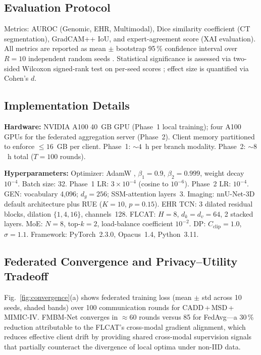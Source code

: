 \documentclass[a4paper,fleqn]{cas-dc}
\begin{document}
\subsection{Evaluation Protocol}

Metrics: AUROC (Genomic, EHR, Multimodal), Dice similarity coefficient
(CT segmentation), GradCAM++ IoU, and expert-agreement score (XAI evaluation).
All metrics are reported as mean $\pm$ bootstrap 95\,\% confidence interval
over $R\!=\!10$ independent random seeds \citep{efron1993bootstrap}.
Statistical significance is assessed via two-sided Wilcoxon signed-rank test
on per-seed scores \citep{wilcoxon1945}; effect size is quantified via Cohen's
$d$.

\subsection{Implementation Details}

\textbf{Hardware:} NVIDIA A100 40~GB GPU (Phase~1 local training); four
A100 GPUs for the federated aggregation server (Phase~2). Client memory
partitioned to enforce $\leq\!16$~GB per client. Phase~1: $\sim\!4$~h per
branch modality. Phase~2: $\sim\!8$~h total ($T\!=\!100$ rounds).

\textbf{Hyperparameters:} Optimizer: AdamW \citep{loshchilov2019adamw},
$\beta_1\!=\!0.9$, $\beta_2\!=\!0.999$, weight decay $10^{-4}$. Batch size: 32.
Phase~1 LR: $3\!\times\!10^{-4}$ (cosine to $10^{-6}$). Phase~2 LR: $10^{-4}$.
GEN: vocabulary 4,096; $d_g\!=\!256$; SSM-attention layers~3. Imaging: nnU-Net-3D
default architecture plus RUE ($K\!=\!10$, $p\!=\!0.15$). EHR TCN: 3 dilated
residual blocks, dilation $\{1,4,16\}$, channels~128. FLCAT: $H\!=\!8$,
$d_k\!=\!d_v\!=\!64$, 2 stacked layers. MoE: $N\!=\!8$, top-$k\!=\!2$,
load-balance coefficient $10^{-2}$. DP: $C_{\mathrm{clip}}\!=\!1.0$,
$\sigma\!=\!1.1$. Framework: PyTorch~2.3.0, Opacus~1.4, Python~3.11.

\subsection{Federated Convergence and Privacy--Utility Tradeoff}

Fig.~\ref{fig:convergence}(a) shows federated training loss (mean $\pm$ std
across 10 seeds, shaded bands) over 100 communication rounds for
CADD\,+\,MSD\,+\,MIMIC-IV. FMBM-Net converges in $\approx\!60$ rounds
versus 85 for FedAvg---a 30\,\% reduction attributable to the FLCAT's
cross-modal gradient alignment, which reduces effective client drift by
providing shared cross-modal supervision signals that partially counteract
the divergence of local optima under non-IID data.
\end{document}
